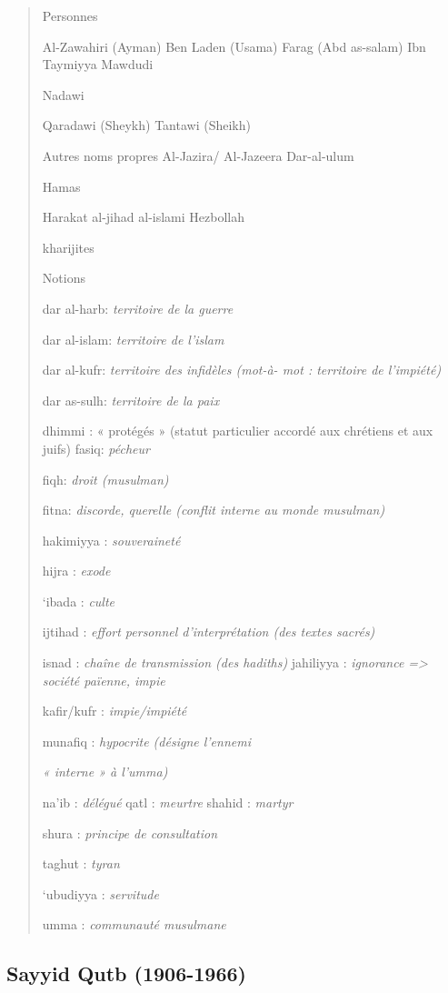 \begin{quote}
{Personnes}

Al-Zawahiri (Ayman) Ben Laden (Usama) Farag (Abd as-salam) Ibn Taymiyya
Mawdudi

Nadawi

Qaradawi (Sheykh) Tantawi (Sheikh)

{Autres noms propres} Al-Jazira/ Al-Jazeera Dar-al-ulum

Hamas

Harakat al-jihad al-islami Hezbollah

kharijites

{Notions}

dar al-harb: \emph{territoire de la guerre}

dar al-islam: \emph{territoire de l'islam}

dar al-kufr: \emph{territoire des infidèles (mot-à- mot : territoire de
l'impiété)}

dar as-sulh: \emph{territoire de la paix}

dhimmi : « protégés » (statut particulier accordé aux chrétiens et aux
juifs) fasiq: \emph{pécheur}

fiqh: \emph{droit (musulman)}

fitna: \emph{discorde, querelle (conflit interne au monde musulman)}

hakimiyya : \emph{souveraineté}

hijra : \emph{exode}

`ibada : \emph{culte}

ijtihad : \emph{effort personnel d'interprétation (des textes sacrés)}

isnad : \emph{chaîne de transmission (des hadiths)} jahiliyya :
\emph{ignorance =\textgreater{} société païenne, impie}

kafir/kufr : \emph{impie/impiété}

munafiq : \emph{hypocrite (désigne l'ennemi}

\emph{« interne » à l'umma)}

na'ib : \emph{délégué} qatl : \emph{meurtre} shahid : \emph{martyr}

shura : \emph{principe de consultation}

taghut : \emph{tyran}

`ubudiyya : \emph{servitude}

umma : \emph{communauté musulmane}
\end{quote}

\hypertarget{sayyid-qutb-1906-1966}{%
\subsection{\texorpdfstring{{Sayyid Qutb
(1906-1966)}}{Sayyid Qutb (1906-1966)}}\label{sayyid-qutb-1906-1966}}

